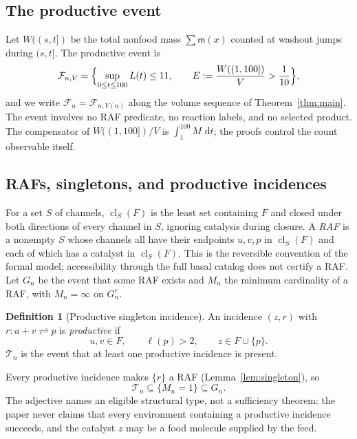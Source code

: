 \documentclass[11pt,letterpaper]{article}
\theoremstyle{plain}
\theoremstyle{definition}
\newtheorem{definition}[theorem]{Definition}
\theoremstyle{remark}
\numberwithin{equation}{section}
\newcommand{\cF}{\mathcal F}
\newcommand{\cT}{\mathcal T}
\newcommand{\cl}{\operatorname{cl}}
\newcommand{\m}{\mathsf m}
\newcommand{\dd}{\,\mathrm d}
\begin{document}
\subsection{The productive event}
Let $W((s,t])$ be the total nonfood mass $\sum\m(x)$ counted at washout jumps during $(s,t]$. The productive event is
\begin{equation}\label{eq:output}
 \cF_{n,V}=\Bigl\{\sup_{0\le t\le100}L(t)\le11,\qquad
 E:=\frac{W((1,100])}{V}>\frac1{10}\Bigr\},
\end{equation}
and we write $\cF_n=\cF_{n,V(n)}$ along the volume sequence of Theorem~\ref{thm:main}. The event involves no RAF predicate, no reaction labels, and no selected product. The compensator of $W((1,100])/V$ is $\int_1^{100}M\,\dd t$; the proofs control the count observable itself.

\subsection{RAFs, singletons, and productive incidences}\label{sec:raf}
For a set $S$ of channels, $\cl_S(F)$ is the least set containing $F$ and closed under both directions of every channel in $S$, ignoring catalysis during closure. A \emph{RAF} is a nonempty $S$ whose channels all have their endpoints $u,v,p$ in $\cl_S(F)$ and each of which has a catalyst in $\cl_S(F)$. This is the reversible convention of the formal model; accessibility through the full basal catalog does not certify a RAF. Let $G_n$ be the event that some RAF exists and $M_n$ the minimum cardinality of a RAF, with $M_n=\infty$ on $G_n^c$.

\begin{definition}[Productive singleton incidence]\label{def:productive}
An incidence $(z,r)$ with $r:u+v\rightleftharpoons p$ is \emph{productive} if
\begin{equation}\label{eq:prod}
 u,v\in F,\qquad \ell(p)>2,\qquad z\in F\cup\{p\} .
\end{equation}
$\cT_n$ is the event that at least one productive incidence is present.
\end{definition}
Every productive incidence makes $\{r\}$ a RAF (Lemma~\ref{lem:singleton}), so
\begin{equation}\label{eq:inclusions}
 \cT_n\subseteq\{M_n=1\}\subseteq G_n .
\end{equation}
The adjective names an eligible structural type, not a sufficiency theorem: the paper never claims that every environment containing a productive incidence succeeds, and the catalyst $z$ may be a food molecule supplied by the feed.
\end{document}
